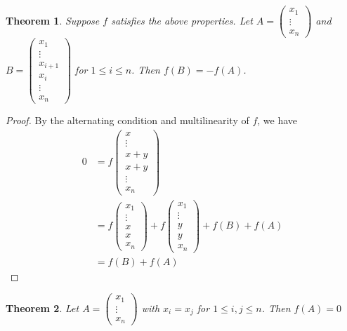 \documentclass{article}
\newtheorem{thm}{Theorem}
\begin{document}
\begin{thm}
Suppose $f$ satisfies the above properties. Let $A= \begin{pmatrix}
x_1 \\
\vdots \\
x_n
\end{pmatrix}$ and $B=\begin{pmatrix}
x_1 \\
\vdots \\ 
x_{i+1} \\ 
x_{i} \\ 
\vdots \\ 
x_n
\end{pmatrix}$
for $1\leq i\leq n$. Then $f(B)=-f(A)$. 
\end{thm}
\begin{proof}
By the alternating condition and multilinearity of $f$, we have 
\begin{align}
0&=f\begin{pmatrix}x \\ \vdots \\ x+y \\ x+y \\ \vdots \\ x_n \end{pmatrix} \\
&=f\begin{pmatrix} x_1 \\ \vdots \\ x \\ x \\ x_n\end{pmatrix} + f\begin{pmatrix} x_1 \\ \vdots \\ y \\ y \\ x_n\end{pmatrix} + f(B)+f(A) \\ 
&=f(B)+f(A)
\end{align}	
\end{proof}
\begin{thm}
Let $A=\begin{pmatrix}x_1 \\ \vdots \\ x_n\end{pmatrix}$ with $x_i=x_j$ for $1\leq i,j \leq n$. Then $f(A)=0$
	
\end{thm}
\end{document}
